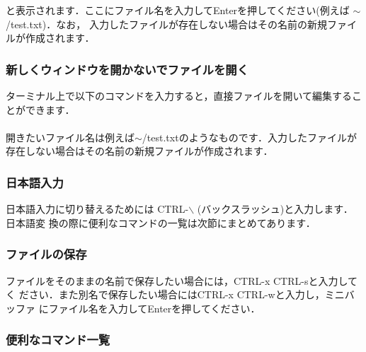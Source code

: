 \documentclass{jarticle}
\begin{document}
\noindent
と表示されます．ここにファイル名を入力してEnterを押してください(例えば $\sim$/test.txt)．なお，
入力したファイルが存在しない場合はその名前の新規ファイルが作成されます．

\subsubsection{新しくウィンドウを開かないでファイルを開く}
ターミナル上で以下のコマンドを入力すると，直接ファイルを開いて編集することができます．\\
\quad \quad {}\\
開きたいファイル名は例えば$\sim$/test.txtのようなものです．入力したファイルが存在しない場合はその名前の新規ファイルが作成されます．

\subsubsection{日本語入力}
日本語入力に切り替えるためには CTRL-$\backslash$ (バックスラッシュ)と入力します．日本語変
換の際に便利なコマンドの一覧は次節にまとめてあります．

\subsubsection{ファイルの保存}
ファイルをそのままの名前で保存したい場合には，CTRL-x CTRL-sと入力してく
ださい．また別名で保存したい場合にはCTRL-x CTRL-wと入力し，ミニバッファ
にファイル名を入力してEnterを押してください．

\subsubsection{便利なコマンド一覧}
\end{document}
